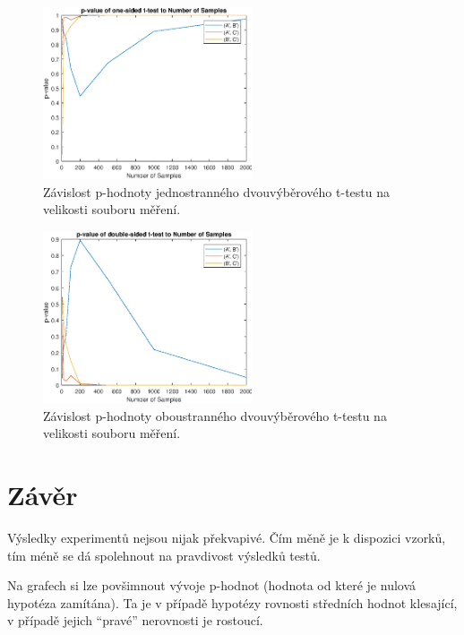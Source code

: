 \begin{figure}[htb]
    \centering
    \includegraphics[width=0.55\textwidth]{graphs/fig1.eps}
    \caption{Závislost p-hodnoty jednostranného dvouvýběrového t-testu na velikosti souboru měření.}
    \label{fig:test1}
\end{figure}
\FloatBarrier

\begin{figure}[htb]
    \centering
    \includegraphics[width=0.55\textwidth]{graphs/fig2.eps}
    \caption{Závislost p-hodnoty oboustranného dvouvýběrového t-testu na velikosti souboru měření.}
    \label{fig:test2}
\end{figure}
\FloatBarrier

\section{Závěr}

Výsledky experimentů nejsou nijak překvapivé.
Čím měně je k dispozici vzorků, tím méně se dá spolehnout na pravdivost výsledků testů.

Na grafech si lze povšimnout vývoje p-hodnot (hodnota od které je nulová hypotéza zamítána).
Ta je v případě hypotézy rovnosti středních hodnot klesající, v případě jejich \enquote{pravé} nerovnosti je rostoucí.
